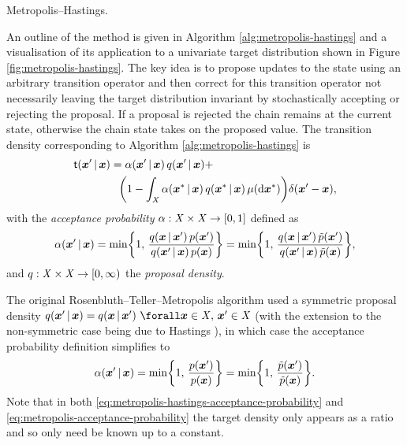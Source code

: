 \begin{algorithm}[!t]
\caption{Metropolis--Hastings.}
\label{alg:metropolis-hastings}

\end{algorithm}

An outline of the method is given in Algorithm \ref{alg:metropolis-hastings} and a visualisation of its application to a univariate target distribution shown in Figure \ref{fig:metropolis-hastings}. The key idea is to propose updates to the state using an arbitrary transition operator and then correct for this transition operator not necessarily leaving the target distribution invariant by stochastically accepting or rejecting the proposal. If a proposal is rejected the chain remains at the current state, otherwise the chain state takes on the proposed value. The transition density corresponding to Algorithm \ref{alg:metropolis-hastings} is
\begin{equation}\label{eq:metropolis-hastings-transition-density}
\begin{split}
  \trans(\vct{x}' \gvn \vct{x}) &=
  \alpha(\vct{x}'\gvn \vct{x})\,q(\vct{x}'\gvn \vct{x}) + \, \\
  &\phantom{=}  
  \lpa 1 - 
  \int_{\set{X}} \alpha(\vct{x}^*\gvn \vct{x})\,q(\vct{x}^*\gvn \vct{x}) \,\mu(\dr\vct{x}^*)
  \rpa
  \delta(\vct{x}' - \vct{x}),
\end{split}
\end{equation}
with the \emph{acceptance probability} $\alpha : \mathit{X} \times \mathit{X} \to [0,1]$ defined as
\begin{equation}\label{eq:metropolis-hastings-acceptance-probability}
  \alpha(\vct{x}'\gvn \vct{x}) =
  \min\lbr 1,\, \frac{q(\vct{x}\gvn\vct{x}')\,\tgtdens(\vct{x}')}{q(\vct{x}'\gvn\vct{x})\,\tgtdens(\vct{x})} \rbr =
  \min\lbr 1,\, \frac{q(\vct{x}\gvn\vct{x}')\,\utgtdens(\vct{x}')}{q(\vct{x}'\gvn\vct{x})\,\utgtdens(\vct{x})} \rbr,
\end{equation}
and  $q : \mathit{X} \times \mathit{X} \to [0, \infty)$ the  \emph{proposal density}. %

The original Rosenbluth--Teller--Metropolis algorithm used a symmetric proposal density $q(\vct{x}' \gvn \vct{x}) = q(\vct{x} \gvn \vct{x}') ~\forall \vct{x} \in \set{X},\,\vct{x}'\in\set{X}$ (with the extension to the non-symmetric case being due to Hastings \citep{hastings1970monte}), in which case the acceptance probability definition simplifies to
\begin{equation}\label{eq:metropolis-acceptance-probability}
  \alpha(\vct{x}'\gvn \vct{x}) =
  \min\lbr 1,\, \frac{\tgtdens(\vct{x}')}{\tgtdens(\vct{x})} \rbr =
  \min\lbr 1,\, \frac{\utgtdens(\vct{x}')}{\utgtdens(\vct{x})} \rbr.
\end{equation}
Note that in both \eqref{eq:metropolis-hastings-acceptance-probability} and \eqref{eq:metropolis-acceptance-probability} the target density only appears as a ratio and so only need be known up to a constant.

